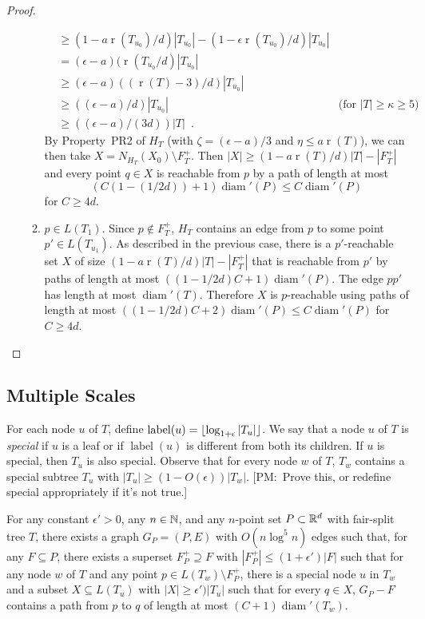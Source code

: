 \documentclass{patmorin}
\newcommand{\note}[2]{{\color{red}[#1:~#2]}}
\DeclareMathOperator{\rank}{r}
\DeclareMathOperator{\diam}{diam}
\DeclareMathOperator{\lbl}{label}
\begin{document}
\begin{proof}
\begin{enumerate}
\begin{enumerate}
\begin{align*}
	      & \ge (1-a\rank(T_{u_0})/d)|T_{u_0}|-(1-\epsilon\rank(T_{u_0})/d)|T_{u_0}| \\
	      & = (\epsilon-a)(\rank(T_{u_0}/d)|T_{u_0}| \\
	      & \ge (\epsilon-a)((\rank(T)-3)/d)|T_{u_0}| \\
	      & \ge ((\epsilon-a)/d)|T_{u_0}| 
		& \text{(for $|T|\ge \kappa \ge 5$)} \\
	      & \ge ((\epsilon-a)/(3d))|T| \enspace .
\end{align*}
		    By Property~PR2 of $H_T$ (with $\zeta = (\epsilon-a)/3$ and $\eta \le a\rank(T)$), we can then take $X=N_{H_T}(X_0)\setminus F^+_T$.  Then $|X| \ge (1-a\rank(T)/d)|T|-|F^+_T|$ and every point $q\in X$ is reachable from $p$ by a path of length at most
		    \[ (C(1-(1/2d))+1)\diam'(P) \le C\diam'(P) \]
	     for $C\ge 4d$.

	    \item $p\in L(T_1)$. Since $p\not\in F^+_T$, $H_T$ contains an
	    edge from $p$ to some point $p'\in L(T_{u_1})$.  As described
	    in the previous case, there is a $p'$-reachable set $X$ of
	    size $(1-a\rank(T)/d)|T|-|F^+_T|$ that is reachable from $p'$
	    by paths of length at most $((1-1/2d)C+1)\diam'(P)$.
	    The edge $pp'$ has length at most
	    $\diam'(T)$. Therefore $X$ is $p$-reachable using
	    paths of length at most $((1-1/2d)C+2)\diam'(P)
	    \le C\diam'(P)$ for $C\ge 4d$.
    \end{enumerate}
  \end{enumerate}
\end{proof}

\subsection{Multiple Scales}

For each node $u$ of $T$, define
$\lbl(u)=\floor{\log_{1+\epsilon}|T_u|}$. We say that a node $u$ of $T$
is \emph{special} if $u$ is a leaf or if $\lbl(u)$ is different from
both its children.  If $u$ is special, then $T_u$ is also special.  Observe that for every node $w$ of $T$, $T_w$
contains a special subtree $T_u$ with $|T_u|\ge (1-O(\epsilon))|T_w|$.
\note{PM}{Prove this, or redefine special appropriately if it's not
true.}

\begin{lem}
  For any constant $\epsilon' >0$, any $n\in\mathbb{N}$, and any $n$-point
  set $P\subset\mathbb{R}^d$ with fair-split tree $T$, there exists a graph
  $G_P=(P,E)$ with $O(n\log^5 n)$ edges such that, for any $F\subseteq
  P$, there exists a superset $F^+_P\supseteq F$ with $|F^+_P|\le
  (1+\epsilon')|F|$ such that for any node $w$ of $T$ and any point
  $p\in L(T_w)\setminus F^+_P$, there is a special node $u$ in $T_w$
  and a subset $X\subseteq L(T_u)$
  with $|X|\ge \epsilon')|T_u|$ such that for every $q\in X$, $G_P-F$
  contains a path from $p$ to $q$ of length at most $(C+1)\diam'(T_w)$.
\end{lem}
\end{document}
